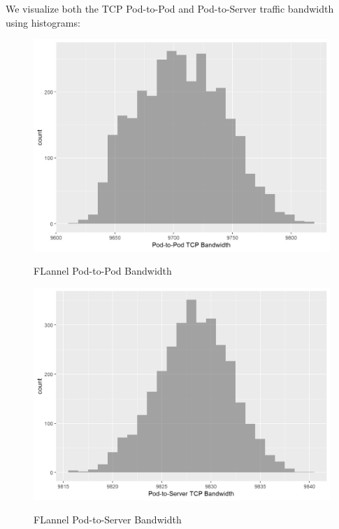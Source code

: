 We visualize both the TCP Pod-to-Pod and Pod-to-Server traffic bandwidth using histograms:

\begin{Shaded}
\begin{Highlighting}[]
\NormalTok{(}\SpecialCharTok{\textasciitilde{}} 
\end{Highlighting}
\end{Shaded}

\begin{figure}[H]
\centering
\caption {FLannel Pod-to-Pod Bandwidth}
\includegraphics[width=\linewidth]{images/unnamed-chunk-8-1.png}
\label{fig:flannel-8-1}
\end{figure}

\begin{Shaded}
\begin{Highlighting}[]
\NormalTok{(}\SpecialCharTok{\textasciitilde{}} 
\end{Highlighting}
\end{Shaded}

\begin{figure}[H]
\centering
\caption {FLannel Pod-to-Server Bandwidth}
\includegraphics[width=\linewidth]{images/unnamed-chunk-9-1.png}
\label{fig:flannel-9-1}
\end{figure}

